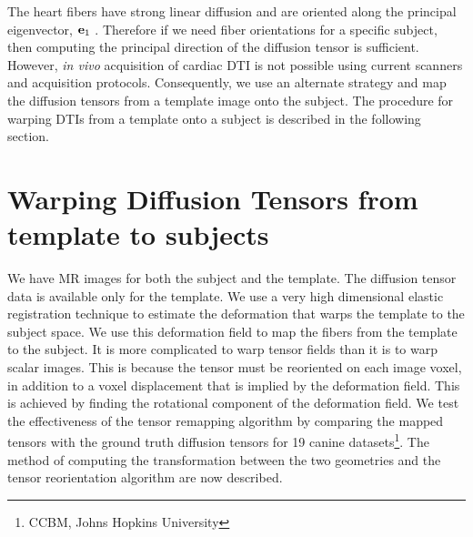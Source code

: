 
The heart fibers have strong linear diffusion %
and are oriented along the principal eigenvector, ${\bf e}_1$ \cite{tseng99, scollan98}. Therefore if we need fiber orientations for a specific subject, then computing the principal direction of the diffusion tensor is sufficient. However, {\em in vivo} acquisition of cardiac DTI is not possible using current scanners and acquisition protocols. Consequently, we use an alternate strategy and map the diffusion tensors from a template image onto the subject. The procedure for warping DTIs from a template onto a subject is described in the following section.

\section {Warping Diffusion Tensors from template to subjects}

We have MR images for both the subject and the template. The diffusion tensor data is available only for the template. We use a very high dimensional elastic registration technique \cite{hammer} to estimate the deformation that warps the template to the subject space. We use this deformation field to map the fibers from the template to the subject. It is more complicated to warp tensor fields than it is to warp scalar images. This is because the tensor must be reoriented on each image voxel, in addition to a voxel displacement that is implied by the deformation field. This is achieved by finding the rotational component of the deformation field. We test the effectiveness of the tensor remapping algorithm by comparing the mapped tensors with the ground truth diffusion tensors for 19 canine datasets\footnote{CCBM, Johns Hopkins University}. The method of computing the transformation between the two geometries and the tensor reorientation algorithm are now described.

